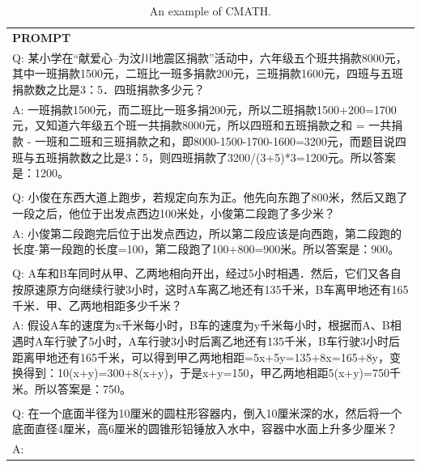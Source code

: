 \begin{table}[h]
    \centering \small
\begin{tabular}{p{12cm}}
\toprule
\textbf{PROMPT}\\
Q: 某小学在“献爱心--为汶川地震区捐款”活动中，六年级五个班共捐款8000元，其中一班捐款1500元，二班比一班多捐款200元，三班捐款1600元，四班与五班捐款数之比是3：5．四班捐款多少元？
\\A: 一班捐款1500元，而二班比一班多捐200元，所以二班捐款1500+200=1700元，又知道六年级五个班一共捐款8000元，所以四班和五班捐款之和 = 一共捐款 - 一班和二班和三班捐款之和，即8000-1500-1700-1600=3200元，而题目说四班与五班捐款数之比是3：5，则四班捐款了3200/(3+5)*3=1200元。所以答案是：1200。
\\
\\Q: 小俊在东西大道上跑步，若规定向东为正。他先向东跑了800米，然后又跑了一段之后，他位于出发点西边100米处，小俊第二段跑了多少米？
\\A: 小俊第二段跑完后位于出发点西边，所以第二段应该是向西跑，第二段跑的长度-第一段跑的长度=100，第二段跑了100+800=900米。所以答案是：900。
\\
\\Q: A车和B车同时从甲、乙两地相向开出，经过5小时相遇．然后，它们又各自按原速原方向继续行驶3小时，这时A车离乙地还有135千米，B车离甲地还有165千米．甲、乙两地相距多少千米？
\\A: 假设A车的速度为x千米每小时，B车的速度为y千米每小时，根据而A、B相遇时A车行驶了5小时，A车行驶3小时后离乙地还有135千米，B车行驶3小时后距离甲地还有165千米，可以得到甲乙两地相距=5x+5y=135+8x=165+8y，变换得到：10(x+y)=300+8(x+y)，于是x+y=150，甲乙两地相距5(x+y)=750千米。所以答案是：750。
\\
\\Q: 在一个底面半径为10厘米的圆柱形容器内，倒入10厘米深的水，然后将一个底面直径4厘米，高6厘米的圆锥形铅锤放入水中，容器中水面上升多少厘米？
\\A:\\
\bottomrule
\end{tabular}
    \caption{\centering An example of CMATH.}
    \label{tab:cmath_eval_format_example}
\end{table}


